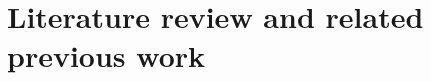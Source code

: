 \documentclass[12pt,journal,compsoc]{IEEEtran}
\begin{document}
%



\section{Literature review and related previous work}
\end{document}
